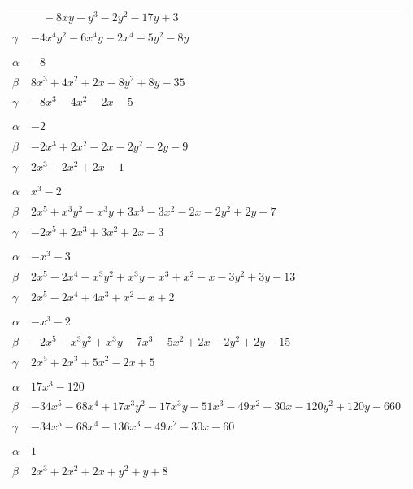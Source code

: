 \documentclass[11pt]{article}
\begin{document}
\begin{longtable}{@{}ll@{}}
 & $\quad -8xy-y^{3}-2y^{2}-17y+3$\\
$\gamma$ & $-4x^{4}y^{2}-6x^{4}y-2x^{4}-5y^{2}-8y$\\
\addlinespace[3pt]
\multicolumn{2}{@{}l}{$\{i,j\}=\{2,5\}$, $k_{ij}=3^{3}$}\\
$\alpha$ & $-8$\\
$\beta$ & $8x^{3}+4x^{2}+2x-8y^{2}+8y-35$\\
$\gamma$ & $-8x^{3}-4x^{2}-2x-5$\\
\addlinespace[3pt]
\multicolumn{2}{@{}l}{$\{i,j\}=\{2,12\}$, $k_{ij}=2\cdot 3$}\\
$\alpha$ & $-2$\\
$\beta$ & $-2x^{3}+2x^{2}-2x-2y^{2}+2y-9$\\
$\gamma$ & $2x^{3}-2x^{2}+2x-1$\\
\addlinespace[3pt]
\multicolumn{2}{@{}l}{$\{i,j\}=\{2,14\}$, $k_{ij}=5$}\\
$\alpha$ & $x^{3}-2$\\
$\beta$ & $2x^{5}+x^{3}y^{2}-x^{3}y+3x^{3}-3x^{2}-2x-2y^{2}+2y-7$\\
$\gamma$ & $-2x^{5}+2x^{3}+3x^{2}+2x-3$\\
\addlinespace[3pt]
\multicolumn{2}{@{}l}{$\{i,j\}=\{2,16\}$, $k_{ij}=2\cdot 5$}\\
$\alpha$ & $-x^{3}-3$\\
$\beta$ & $2x^{5}-2x^{4}-x^{3}y^{2}+x^{3}y-x^{3}+x^{2}-x-3y^{2}+3y-13$\\
$\gamma$ & $2x^{5}-2x^{4}+4x^{3}+x^{2}-x+2$\\
\addlinespace[3pt]
\multicolumn{2}{@{}l}{$\{i,j\}=\{2,23\}$, $k_{ij}=3$}\\
$\alpha$ & $-x^{3}-2$\\
$\beta$ & $-2x^{5}-x^{3}y^{2}+x^{3}y-7x^{3}-5x^{2}+2x-2y^{2}+2y-15$\\
$\gamma$ & $2x^{5}+2x^{3}+5x^{2}-2x+5$\\
\addlinespace[3pt]
\multicolumn{2}{@{}l}{$\{i,j\}=\{2,25\}$, $k_{ij}=2^{5}\cdot 3\cdot 5$}\\
$\alpha$ & $17x^{3}-120$\\
$\beta$ & $-34x^{5}-68x^{4}+17x^{3}y^{2}-17x^{3}y-51x^{3}-49x^{2}-30x-120y^{2}+120y-660$\\
$\gamma$ & $-34x^{5}-68x^{4}-136x^{3}-49x^{2}-30x-60$\\
\addlinespace[3pt]
\multicolumn{2}{@{}l}{$\{i,j\}=\{3,4\}$, $k_{ij}=3^{2}$}\\
$\alpha$ & $1$\\
$\beta$ & $2x^{3}+2x^{2}+2x+y^{2}+y+8$\\

\end{longtable}
\end{document}
